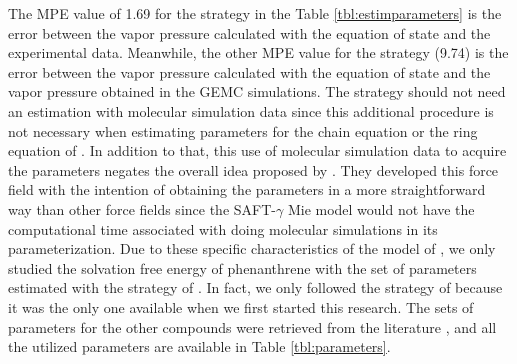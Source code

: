 The MPE value of 1.69 for the  strategy in the Table \ref{tbl:estimparameters} is the error between the vapor pressure calculated with the equation of state and the experimental data. Meanwhile, the other MPE value for the  strategy (9.74) is the error between the vapor pressure calculated with the equation of state and the vapor pressure obtained in the GEMC simulations. The  strategy should not need an estimation with molecular simulation data since this additional procedure is not necessary when estimating parameters for the chain equation \cite{avendano2011} or the ring equation of . In addition to that, this use of molecular simulation data to acquire the parameters negates the overall idea proposed by \cite{avendano2011}. They developed this force field with the intention of obtaining the parameters in a more straightforward way than other force fields since the SAFT-$\gamma$ Mie model would not have the computational time associated with doing molecular simulations in its parameterization. Due to these specific characteristics of the model of , we only studied the solvation free energy of phenanthrene with the set of parameters estimated with the strategy of . In fact, we only followed the strategy of  because it was the only one available when we first started this research. The sets of parameters for the other compounds were retrieved from the literature \cite{lobanova2016,herdes2015,ervik2016,muller2017}, and all the utilized parameters are available in Table \ref{tbl:parameters}.

